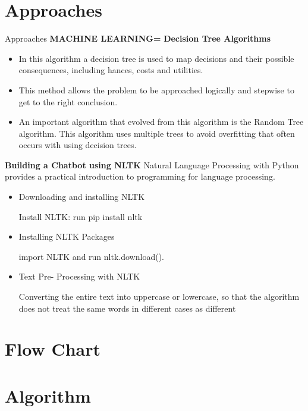 \documentclass{beamer}
\begin{document}
                \section{Approaches}
                \begin{frame}{Approaches}
                \textbf{MACHINE LEARNING=}
                \textbf{Decision Tree Algorithms}
  \begin{itemize}
\item  
In this algorithm a decision tree is used to map decisions and their possible consequences, including hances, costs and utilities.
 \medskip
\item This method allows the problem to be approached logically and stepwise to get to the right conclusion.
 \medskip
\item An important algorithm that evolved from this algorithm is the Random Tree algorithm. This algorithm uses multiple trees to avoid overfitting that often occurs with using decision trees.
 \end{itemize}
\end{frame}

\begin{frame}

 \textbf{Building a Chatbot
using NLTK }
Natural Language Processing with Python provides a practical introduction to programming for language processing.
  \begin{itemize}
\item  
Downloading and installing NLTK

    Install NLTK: run pip install nltk
   
 \medskip
\item Installing NLTK Packages

import NLTK and run nltk.download().
 \medskip
\item Text Pre- Processing with NLTK

    Converting the entire text into uppercase or lowercase, so that the algorithm does not treat the same words in different cases as different
 
 \end{itemize}

\end{frame}                
               
                
                \section{Flow Chart}
                \section{Algorithm}
\end{document}
